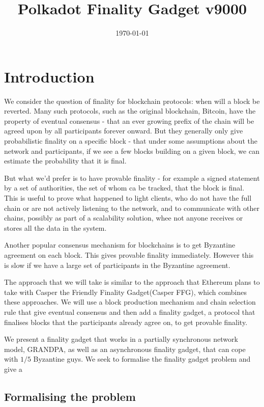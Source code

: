 \documentclass{article}
\begin{document}
\title{Polkadot Finality Gadget v9000}
\date{\today}
\maketitle

\section{Introduction}

We consider the question of finality for blockchain protocols: when will a block be reverted. Many such protocols, such as the original blockchain, Bitcoin, have the property of eventual consensus - that an ever growing prefix of the chain will be agreed upon by all participants forever onward. But they generally only give probabilistic finality on a specific block - that under some assumptions about the network and participants, if we see a few blocks building on a given block, we can estimate the probability that it is final.

But what we'd prefer is to have provable finality - for example a signed statement by a set of authorities, the set of whom ca be tracked, that the block is final. This is useful to prove what happened to light clients, who do not have the full chain or are not actively listening to the network, and to communicate with other chains, possibly as part of a scalability solution, whee not anyone receives or stores all the data in the system. 

Another popular consensus mechanism for blockchains is to get Byzantine agreement on each block. This gives provable finality immediately. However this is slow if we have a large set of participants in the Byzantine agreement.

The approach that we will take is similar to the approach that Ethereum plans to take with Casper the Friendly Finality Gadget(Casper FFG)\cite{CasperFFG}, which combines these approaches. We will use a block production mechanism and chain selection rule that give eventual consensus and then add a finality gadget, a protocol that finalises blocks that the participants already agree on, to get provable finality.

We present a finality gadget that works in a partially synchronous network model, GRANDPA, as well as an asynchronous finality gadget, that can cope with $1/5$ Byzantine guys. We seek to formalise the finality gadget problem and give a 

\subsection{Formalising the problem}
\end{document}
